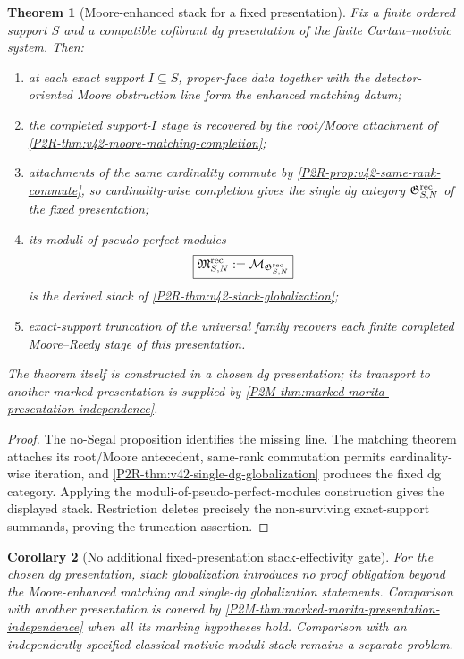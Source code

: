 \documentclass[11pt]{article}
\newtheorem{theorem}{Theorem}[section]
\newtheorem{corollary}[theorem]{Corollary}
\theoremstyle{remark}
\begin{document}
\begin{theorem}[Moore-enhanced stack for a fixed presentation]
\label{thm:moore-enhanced-stack-globalization}
Fix a finite ordered support \(S\) and a compatible cofibrant dg presentation
of the finite Cartan--motivic system.  Then:
\begin{enumerate}[label=\textup{(\roman*)}]
\item at each exact support \(I\subseteq S\), proper-face data together with
      the detector-oriented Moore obstruction line form the enhanced matching
      datum;
\item the completed support-\(I\) stage is recovered by the root/Moore
      attachment of \cref{P2R-thm:v42-moore-matching-completion};
\item attachments of the same cardinality commute by
      \cref{P2R-prop:v42-same-rank-commute}, so cardinality-wise completion
      gives the single dg category
      \(\mathfrak G^{\rm rec}_{S,N}\) of the fixed presentation;
\item its moduli of pseudo-perfect modules
      \[
       \boxed{
       \mathfrak M^{\rm rec}_{S,N}
       :=\mathcal M_{\mathfrak G^{\rm rec}_{S,N}}}
      \]
      is the derived stack of \cref{P2R-thm:v42-stack-globalization};
\item exact-support truncation of the universal family recovers each finite
      completed Moore--Reedy stage of this presentation.
\end{enumerate}
The theorem itself is constructed in a chosen dg presentation; its transport
to another marked presentation is supplied by
\cref{P2M-thm:marked-morita-presentation-independence}.
\end{theorem}

\begin{proof}
The no-Segal proposition identifies the missing line.  The matching theorem
attaches its root/Moore antecedent, same-rank commutation permits
cardinality-wise iteration, and
\cref{P2R-thm:v42-single-dg-globalization} produces the fixed dg category.
Applying the moduli-of-pseudo-perfect-modules construction gives the displayed
stack.  Restriction deletes precisely the non-surviving exact-support
summands, proving the truncation assertion.
\end{proof}

\begin{corollary}[No additional fixed-presentation stack-effectivity gate]
\label{cor:no-additional-stack-effectivity-gate}
For the chosen dg presentation, stack globalization introduces no proof
obligation beyond the Moore-enhanced matching and single-dg globalization
statements.  Comparison with another presentation is covered by
\cref{P2M-thm:marked-morita-presentation-independence} when all its marking
hypotheses hold.  Comparison with an independently specified classical motivic
moduli stack remains a separate problem.
\end{corollary}
\end{document}
